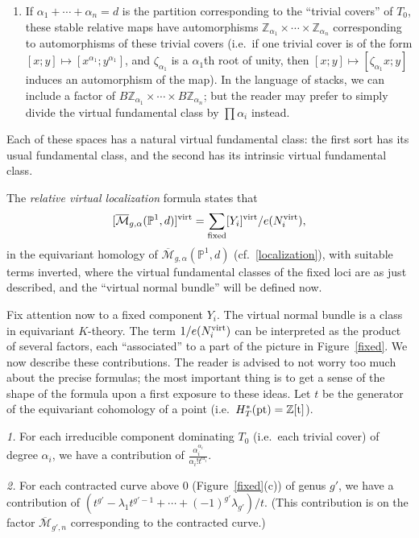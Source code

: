\documentclass[12pt,letterpaper]{amsart}
\newcommand{\Z}{\mathbb{Z}}
\newcommand{\proj}{\mathbb P}
\newcommand{\cm}{{\mathcal{M}}}
\newcommand{\cmbar}{\overline{\cm}}
\newcommand{\al}{\alpha}
\newcommand{\la}{\lambda}
\newcommand{\virt}{\rm{virt}}
\newcommand{\fixed}{\rm{fixed}}
\begin{document}
{\begin{enumerate}
\item[(C)] If $\al_1 + \cdots + \al_n = d$ is the partition corresponding
to the ``trivial covers'' of $T_0$, these stable relative maps
have automorphisms $\Z_{\al_1} \times \cdots  \times \Z_{\al_n}$ corresponding
to automorphisms of these trivial covers 
(i.e.\ if one  trivial cover is of the form $[x;y] \mapsto [x^{\al_1}; y^{\al_1}]$, 
and $\zeta_{\al_1}$ is a $\al_1$th root of unity, then
$[x;y] \mapsto [\zeta_{\al_1} x ; y]$ induces an automorphism  of 
the map).  In the language of stacks, we can include a factor of 
$B\Z_{\al_1} \times \cdots \times B\Z_{\al_n}$; but the reader may prefer
to simply divide the virtual fundamental class by  $\prod \al_i$ instead.
\end{enumerate}

Each of these spaces has a natural virtual fundamental class:
the first sort has its usual fundamental class, and the 
second has its intrinsic virtual fundamental class.

The {\em relative virtual localization} formula states that
$$
[\cmbar_{g, \al}(\proj^1,d)]^{\virt} = \sum_{\fixed} [Y_i]^{\virt} 
/ e(N_i^{\virt}),
$$
in the equivariant homology of $\cmbar_{g,\al}(\proj^1,d)$ (cf.\
\eqref{localization}), with suitable terms inverted, where the virtual
fundamental classes of the fixed loci are as just described, and the
``virtual normal bundle'' will be defined now.

Fix attention now to a fixed component $Y_i$.  The virtual normal
bundle is a class in equivariant $K$-theory.  The term $1/
e(N_i^{\virt})$ can be interpreted as the product of several factors,
each ``associated'' to a part of the picture in Figure~\ref{fixed}.
We now describe these contributions.  The reader is advised to not
worry too much about the precise formulas; the most important thing is
to get a sense of the shape of the formula upon a first exposure to
these ideas.  Let $t$ be the generator of the equivariant cohomology
of a point (i.e.\ $H_T^*(\rm{pt}) = \Z[t]$).

{\em 1.}  For each irreducible component dominating $T_0$ (i.e.\ each 
trivial cover) of degree $\al_i$, we have a contribution of 
$\frac {\al_i^{\al_i}}  {\al_i! t^{\al_i}}$.

{\em 2.}  For each contracted curve above $0$ (Figure~\ref{fixed}(c))
of genus $g'$, we have a contribution of $(t^{g'} - \la_1 t^{g'-1}
+ \cdots + (-1)^{g' } \la_{g'}) / t$.  (This contribution is on
the factor $\cmbar_{g',n}$ corresponding to the contracted curve.)

}
\end{document}
